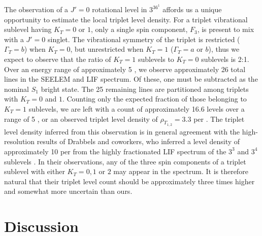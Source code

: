 \documentclass[12pt]{mitthesis}
\begin{document}
The observation of a $J'=0$ rotational level in $3^36^1$ 
affords us a unique opportunity to estimate the local triplet level
density.  For a triplet vibrational sublevel having $K_T=0$ or $1$,
only a single spin component, $F_3$, is present to mix with a $J'=0$
singlet.  The vibrational symmetry of the triplet is restricted
($\Gamma_T=b$) when $K_T=0$, but unrestricted when $K_T=1$
($\Gamma_T=a$ or $b$), thus we expect to observe that the ratio of
$K_T=1$ sublevels to $K_T=0$ sublevels is 2:1.  Over an energy range
of approximately 5 \rcm, we observe approximately 26 total lines in
the SEELEM and LIF spectrum.  Of these, one must be subtracted as the
nominal $S_1$ bright state.  The 25 remaining lines are partitioned
among triplets with $K_T=0$ and $1$.  Counting only the expected
fraction of those belonging to $K_T=1$ sublevels, we are left with a
count of approximately 16.6 levels over a range of 5 \rcm, or an
observed triplet level density of $\rho_{T_{1,2}} = 3.3$ per \rcm.
The triplet level density inferred from this observation is in general
agreement with the high-resolution results of Drabbels and coworkers,
who inferred a level density of approximately 10 per \rcm from the
highly fractionated LIF spectrum of the $3^3$  and $3^4$ 
sublevels \cite{drabbels94}.  In their observations, any of the three
spin components of a triplet sublevel with either $K_T=0, 1$ or $2$
may appear in the spectrum.  It is therefore natural that their
triplet level count should be approximately three times higher and
somewhat more uncertain than ours.



\section{Discussion}

\end{document}
